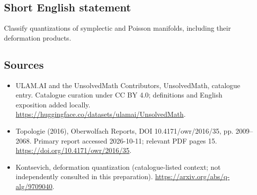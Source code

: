 \documentclass[11pt]{article}
\begin{document}
\subsection{Short English statement}
Classify quantizations of symplectic and Poisson manifolds, including their deformation products.
\subsection{Sources}
\begin{itemize}
\item[\hypertarget{source:statement:1}{S1}] ULAM.AI and the UnsolvedMath Contributors, UnsolvedMath, catalogue entry. Catalogue curation under CC BY 4.0; definitions and English exposition added locally.
\url{https://huggingface.co/datasets/ulamai/UnsolvedMath}.
\item[\hypertarget{source:statement:2}{S2}] Topologie (2016), Oberwolfach Reports, DOI 10.4171/owr/2016/35, pp. 2009--2068. Primary report accessed 2026-10-11; relevant PDF pages 15.
\url{https://doi.org/10.4171/owr/2016/35}.
\item[\hypertarget{source:statement:3}{S3}] Kontsevich, deformation quantization (catalogue-listed context; not independently consulted in this preparation).
\url{https://arxiv.org/abs/q-alg/9709040}.
\end{itemize}
\label{end:statement}
\end{document}
